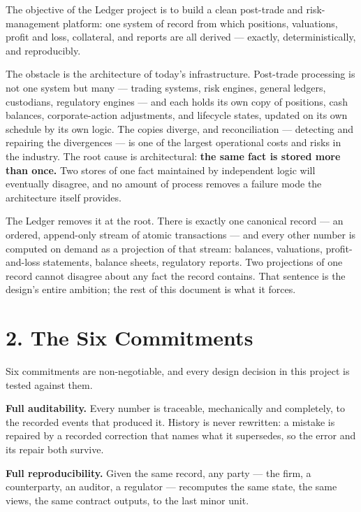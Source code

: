 \documentclass[11pt,a4paper]{article}
\begin{document}
The objective of the Ledger project is to build a clean post-trade and
risk-management platform: one system of record from which positions,
valuations, profit and loss, collateral, and reports are all derived ---
exactly, deterministically, and reproducibly.

The obstacle is the architecture of today's infrastructure. Post-trade
processing is not one system but many --- trading systems, risk engines,
general ledgers, custodians, regulatory engines --- and each holds its
own copy of positions, cash balances, corporate-action adjustments, and
lifecycle states, updated on its own schedule by its own logic. The
copies diverge, and reconciliation --- detecting and repairing the
divergences --- is one of the largest operational costs and risks in the
industry. The root cause is architectural: \textbf{the same fact is
stored more than once.} Two stores of one fact maintained by independent
logic will eventually disagree, and no amount of process removes a
failure mode the architecture itself provides.

The Ledger removes it at the root. There is exactly one canonical record
--- an ordered, append-only stream of atomic transactions --- and every
other number is computed on demand as a projection of that stream:
balances, valuations, profit-and-loss statements, balance sheets,
regulatory reports. Two projections of one record cannot disagree about
any fact the record contains. That sentence is the design's entire
ambition; the rest of this document is what it forces.

\hypertarget{the-six-commitments}{%
\section{2. The Six Commitments}\label{the-six-commitments}}

Six commitments are non-negotiable, and every design decision in this
project is tested against them.

\textbf{Full auditability.} Every number is traceable, mechanically and
completely, to the recorded events that produced it. History is never
rewritten: a mistake is repaired by a recorded correction that names
what it supersedes, so the error and its repair both survive.

\textbf{Full reproducibility.} Given the same record, any party --- the
firm, a counterparty, an auditor, a regulator --- recomputes the same
state, the same views, the same contract outputs, to the last minor
unit.
\end{document}
